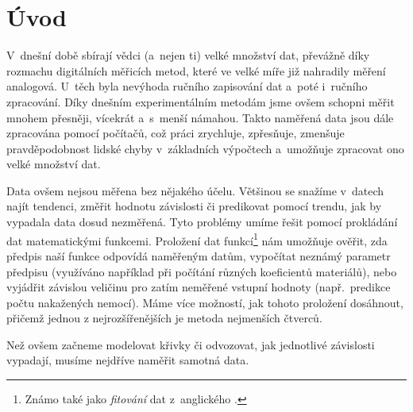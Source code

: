 \section{Úvod}
V~dnešní době sbírají vědci (a~nejen ti) velké množství dat, převážně díky
rozmachu digitálních měřicích metod, které ve velké míře již nahradily měření
analogová. U~těch byla nevýhoda ručního zapisování dat a~poté i~ručního
zpracování. Díky dnešním experimentálním metodám jsme ovšem schopni měřit
mnohem přesněji, vícekrát a~s~menší námahou. Takto naměřená data jsou dále
zpracována pomocí počítačů, což práci zrychluje, zpřesňuje, zmenšuje
pravděpodobnost lidské chyby v~základních výpočtech a~umožňuje zpracovat ono
velké množství dat.

Data ovšem nejsou měřena bez nějakého účelu. Většinou se snažíme v~datech najít
tendenci, změřit hodnotu závislosti či predikovat pomocí trendu, jak by
vypadala data dosud nezměřená. Tyto problémy umíme řešit pomocí prokládání dat
matematickými funkcemi. Proložení dat funkcí\footnote{Známo také jako
\emph{fitování} dat z~anglického .} nám umožňuje ověřit, zda předpis
naší funkce odpovídá naměřeným datům, vypočítat neznámý parametr předpisu
(využíváno například při počítání různých koeficientů materiálů), nebo
vyjádřit závislou veličinu pro zatím neměřené vstupní hodnoty (např.~predikce
počtu nakažených nemocí). Máme více možností, jak tohoto proložení dosáhnout,
přičemž jednou z nejrozšířenějších je metoda nejmenších čtverců.


Než ovšem začneme modelovat křivky či odvozovat, jak jednotlivé
závislosti vypadají, musíme nejdříve naměřit samotná data. 

